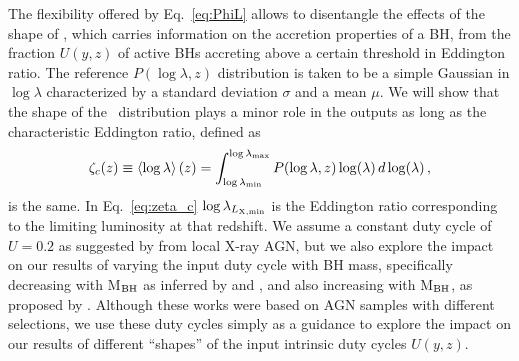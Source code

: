 The flexibility offered by Eq.~\ref{eq:PhiL} allows to disentangle the effects of the shape
of \PLz, which carries information on the accretion properties of a BH, from the fraction
$U(y,z)$ of active BHs accreting above a certain threshold in Eddington ratio. The reference
$P(\log \lambda,z)$ distribution is taken to be a simple Gaussian in $\log \lambda$
characterized by a standard deviation $\sigma$ and a mean $\mu$. We will show that the shape
of the \PLz\ distribution plays a minor role in the outputs as long as the characteristic
Eddington ratio, defined as
\begin{equation}
\zeta_c(z)\equiv\left<\log \lambda\right>(z)=\int_{\log\lambda_{\rm min}}^{\log \lambda_{\rm max}} P(\log\lambda,z)\log(\lambda) \,d\log(\lambda)\, ,
\label{eq:zeta_c}
\end{equation}
is the same. In Eq.~\ref{eq:zeta_c} $\log\lambda_{L_{\rm X,min}}$ is the Eddington ratio corresponding to the limiting luminosity at that redshift.
We assume a constant duty cycle of $U=0.2$ as suggested by \citet{goulding10} from local X-ray
AGN, but we also explore the impact on our results of varying the input duty cycle with
BH mass, specifically decreasing with M$_{\rm BH}$ as inferred by \citet{2010A&A...516A..87S}
and \citet{2015MNRAS.447.2085S}, and also increasing with M$_{\rm BH}$, as proposed by
\citet{2019MNRAS.488...89M}. Although these works were based on AGN samples with different
selections, we use these duty cycles simply as a guidance to explore the impact on our results
of different ``shapes'' of the input intrinsic duty cycles $U(y,z)$.

